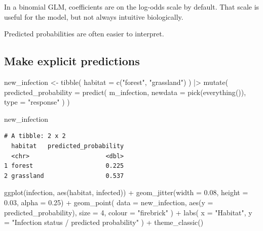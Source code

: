 \documentclass[
  letterpaper,
  8pt,
  a4paper]{book}
\newenvironment{Shaded}{\begin{snugshade}}{\end{snugshade}}
\newcommand{\AttributeTok}[1]{\textcolor[rgb]{0.40,0.45,0.13}{#1}}
\newcommand{\DecValTok}[1]{\textcolor[rgb]{0.68,0.00,0.00}{#1}}
\newcommand{\FloatTok}[1]{\textcolor[rgb]{0.68,0.00,0.00}{#1}}
\newcommand{\FunctionTok}[1]{\textcolor[rgb]{0.28,0.35,0.67}{#1}}
\newcommand{\NormalTok}[1]{\textcolor[rgb]{0.00,0.23,0.31}{#1}}
\newcommand{\OtherTok}[1]{\textcolor[rgb]{0.00,0.23,0.31}{#1}}
\newcommand{\SpecialCharTok}[1]{\textcolor[rgb]{0.37,0.37,0.37}{#1}}
\newcommand{\StringTok}[1]{\textcolor[rgb]{0.13,0.47,0.30}{#1}}
\begin{document}
In a binomial GLM, coefficients are on the log-odds scale by default.
That scale is useful for the model, but not always intuitive
biologically.

Predicted probabilities are often easier to interpret.

\subsection*{Make explicit
predictions}\label{make-explicit-predictions-1}

\begin{Shaded}
\begin{Highlighting}[]
\NormalTok{new\_infection }\OtherTok{\textless{}{-}} \FunctionTok{tibble}\NormalTok{(}
  \AttributeTok{habitat =} \FunctionTok{c}\NormalTok{(}\StringTok{"forest"}\NormalTok{, }\StringTok{"grassland"}\NormalTok{)}
\NormalTok{) }\SpecialCharTok{|\textgreater{}}
  \FunctionTok{mutate}\NormalTok{(}
    \AttributeTok{predicted\_probability =} \FunctionTok{predict}\NormalTok{(}
\NormalTok{      m\_infection,}
      \AttributeTok{newdata =} \FunctionTok{pick}\NormalTok{(}\FunctionTok{everything}\NormalTok{()),}
      \AttributeTok{type =} \StringTok{"response"}
\NormalTok{    )}
\NormalTok{  )}

\NormalTok{new\_infection}
\end{Highlighting}
\end{Shaded}

\begin{verbatim}
# A tibble: 2 x 2
  habitat   predicted_probability
  <chr>                     <dbl>
1 forest                    0.225
2 grassland                 0.537
\end{verbatim}

\begin{Shaded}
\begin{Highlighting}[]
\FunctionTok{ggplot}\NormalTok{(infection, }\FunctionTok{aes}\NormalTok{(habitat, infected)) }\SpecialCharTok{+}
  \FunctionTok{geom\_jitter}\NormalTok{(}\AttributeTok{width =} \FloatTok{0.08}\NormalTok{, }\AttributeTok{height =} \FloatTok{0.03}\NormalTok{, }\AttributeTok{alpha =} \FloatTok{0.25}\NormalTok{) }\SpecialCharTok{+}
  \FunctionTok{geom\_point}\NormalTok{(}
    \AttributeTok{data =}\NormalTok{ new\_infection,}
    \FunctionTok{aes}\NormalTok{(}\AttributeTok{y =}\NormalTok{ predicted\_probability),}
    \AttributeTok{size =} \DecValTok{4}\NormalTok{,}
    \AttributeTok{colour =} \StringTok{"firebrick"}
\NormalTok{  ) }\SpecialCharTok{+}
  \FunctionTok{labs}\NormalTok{(}
    \AttributeTok{x =} \StringTok{"Habitat"}\NormalTok{,}
    \AttributeTok{y =} \StringTok{"Infection status / predicted probability"}
\NormalTok{  ) }\SpecialCharTok{+}
  \FunctionTok{theme\_classic}\NormalTok{()}
\end{Highlighting}
\end{Shaded}
\end{document}
